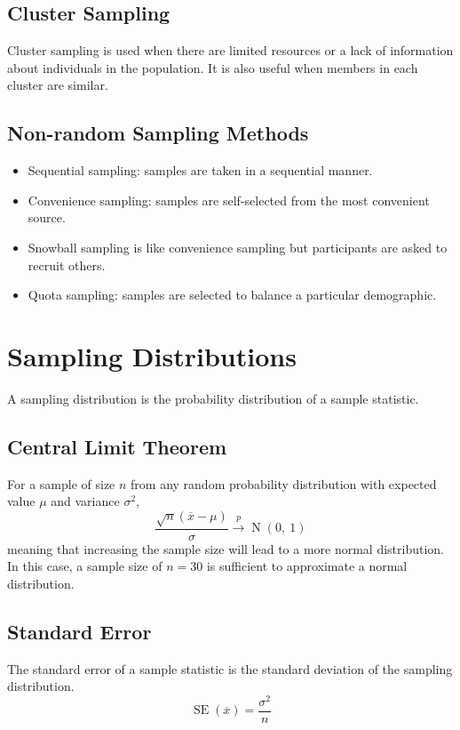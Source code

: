 \documentclass{article}
\begin{document}
\subsection{Cluster Sampling}
Cluster sampling is used when there are limited resources or a lack of information about individuals in
the population. It is also useful when members in each cluster are similar.
\subsection{Non-random Sampling Methods}
\begin{itemize}
    \item Sequential sampling: samples are taken in a sequential manner.
    \item Convenience sampling: samples are self-selected from the most convenient source.
    \item Snowball sampling is like convenience sampling but participants are asked to recruit others.
    \item Quota sampling: samples are selected to balance a particular demographic.
\end{itemize}
\section{Sampling Distributions}
A sampling distribution is the probability distribution of a sample statistic.
\subsection{Central Limit Theorem}
For a sample of size \(n\) from any random probability distribution with expected value \(\mu\)
and variance \(\sigma^2\),
\begin{equation*}
    \frac{\sqrt{n}\left( \overline{x} - \mu \right)}{\sigma} \overset{p}{\rightarrow} \operatorname{N}{\left( 0,\: 1 \right)}
\end{equation*}
meaning that increasing the sample size will lead to a more normal distribution.
In this case, a sample size of \(n = 30\) is sufficient to approximate a normal distribution.
\subsection{Standard Error}
The standard error of a sample statistic is the standard deviation of the sampling distribution.
\begin{equation*}
    \operatorname{SE}{\left( \overline{x} \right)} = \frac{\sigma^2}{n}
\end{equation*}
\end{document}
